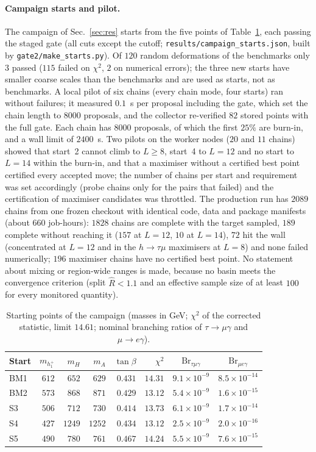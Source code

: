 \documentclass[twocolumn,epjc3]{svjour3}
\newcommand{\Br}{\mathrm{Br}}
\begin{document}
\paragraph{Campaign starts and pilot.} The campaign of Sec.~\ref{sec:res} starts from the five points of Table~\ref{tab:starts}, each passing the staged gate (all cuts except the cutoff; \texttt{results/campaign\_starts.json}, built by \texttt{gate2/make\_starts.py}). Of $120$ random deformations of the benchmarks only $3$ passed ($115$ failed on $\chi^2$, $2$ on numerical errors); the three new starts have smaller coarse scales than the benchmarks and are used as starts, not as benchmarks. A local pilot of six chains (every chain mode, four starts) ran without failures; it measured $0.1$~s per proposal including the gate, which set the chain length to $8000$ proposals, and the collector re-verified $82$ stored points with the full gate. Each chain has $8000$ proposals, of which the first $25\%$ are burn-in, and a wall limit of $2400$~s. Two pilots on the worker nodes ($20$ and $11$ chains) showed that start~2 cannot climb to $L\ge8$, start~4 to $L=12$ and no start to $L=14$ within the burn-in, and that a maximiser without a certified best point certified every accepted move; the number of chains per start and requirement was set accordingly (probe chains only for the pairs that failed) and the certification of maximiser candidates was throttled. The production run has $2089$ chains from one frozen checkout with identical code, data and package manifests (about $660$ job-hours): $1828$ chains are complete with the target sampled, $189$ complete without reaching it ($157$ at $L=12$, $10$ at $L=14$), $72$ hit the wall (concentrated at $L=12$ and in the $h\to\tau\mu$ maximisers at $L=8$) and none failed numerically; $196$ maximiser chains have no certified best point. No statement about mixing or region-wide ranges is made, because no basin meets the convergence criterion (split $\hat R<1.1$ and an effective sample size of at least $100$ for every monitored quantity).
\begin{table}[t]
\centering\small
\caption{Starting points of the campaign (masses in GeV; $\chi^2$ of the corrected statistic, limit $14.61$; nominal branching ratios of $\tau\to\mu\gamma$ and $\mu\to e\gamma$).}\label{tab:starts}
\begin{tabular}{lrrrrrcc}
\hline
Start & $m_{h_1^+}$ & $m_H$ & $m_A$ & $\tan\beta$ & $\chi^2$ & $\Br_{\tau\mu\gamma}$ & $\Br_{\mu e\gamma}$\\
\hline
BM1 & $612$ & $652$ & $629$ & $0.431$ & $14.31$ & $9.1\times10^{-9}$ & $8.5\times10^{-14}$\\
BM2 & $573$ & $868$ & $871$ & $0.429$ & $13.12$ & $5.4\times10^{-9}$ & $1.6\times10^{-15}$\\
S3 & $506$ & $712$ & $730$ & $0.414$ & $13.73$ & $6.1\times10^{-9}$ & $1.7\times10^{-14}$\\
S4 & $427$ & $1249$ & $1252$ & $0.434$ & $13.12$ & $2.5\times10^{-9}$ & $2.0\times10^{-16}$\\
S5 & $490$ & $780$ & $761$ & $0.467$ & $14.24$ & $5.5\times10^{-9}$ & $7.6\times10^{-15}$\\
\hline
\end{tabular}
\end{table}
\end{document}
